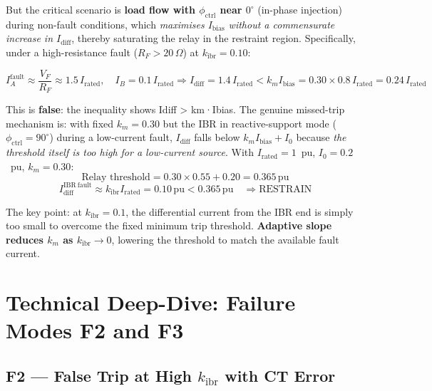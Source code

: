 \documentclass[12pt,a4paper]{article}
\newcommand{\kibr}{k_\mathrm{ibr}}
\newcommand{\Irated}{I_\mathrm{rated}}
\newcommand{\Idiff}{I_\mathrm{diff}}
\newcommand{\Ibias}{I_\mathrm{bias}}
\newcommand{\km}{k_m}
\newcommand{\Izero}{I_0}
\newcommand{\phictrl}{\phi_\mathrm{ctrl}}
\begin{document}
But the critical scenario is \textbf{load flow with $\phictrl$ near $0^\circ$} (in-phase
injection) during non-fault conditions, which \emph{maximises $\Ibias$ without a
commensurate increase in $\Idiff$}, thereby saturating the relay in the restraint region.
Specifically, under a high-resistance fault ($R_F > 20\,\Omega$) at $\kibr = 0.10$:

\begin{equation}
  I_A^\mathrm{fault} \approx \frac{V_F}{R_F} \approx 1.5\,\Irated, \quad
  I_B = 0.1\,\Irated \Rightarrow
  \Idiff = 1.4\,\Irated < \km \Ibias = 0.30 \times 0.8\,\Irated = 0.24\,\Irated
\end{equation}

This is \textbf{false}: the inequality shows Idiff > km·Ibias. The genuine missed-trip
mechanism is: with fixed $\km = 0.30$ but the IBR in reactive-support mode ($\phictrl = 90^\circ$)
during a low-current fault, $\Idiff$ falls below $\km\Ibias + \Izero$ because
\emph{the threshold itself is too high for a low-current source}.  With $\Irated = 1$~pu,
$I_0 = 0.2$~pu, $\km = 0.30$:
\begin{equation}
  \text{Relay threshold} = 0.30 \times 0.55 + 0.20 = 0.365\,\mathrm{pu}
\end{equation}
\begin{equation}
  \Idiff^\mathrm{IBR~fault} \approx \kibr\Irated = 0.10\,\mathrm{pu}
  < 0.365\,\mathrm{pu} \quad \Rightarrow \text{RESTRAIN}
\end{equation}

The key point: at $\kibr = 0.1$, the differential current from the IBR end is simply too
small to overcome the fixed minimum trip threshold.  \textbf{Adaptive slope reduces $\km$
as $\kibr \to 0$}, lowering the threshold to match the available fault current.

\section{Technical Deep-Dive: Failure Modes F2 and F3}

\subsection{F2 --- False Trip at High $\kibr$ with CT Error}
\end{document}

